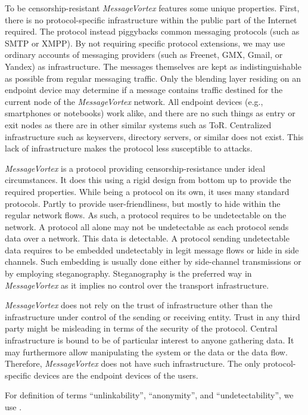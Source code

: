 \documentclass[acmsmall, screen, review]{acmart}
\begin{document}
To be censorship-resistant \emph{MessageVortex} features some unique properties. First, there is no protocol-specific infrastructure within the public part of the Internet required. The protocol instead piggybacks common messaging protocols (such as SMTP or XMPP). By not requiring specific protocol extensions, we may use ordinary accounts of messaging providers (such as Freenet, GMX, Gmail, or Yandex) as infrastructure. The messages themselves are kept as indistinguishable as possible from regular messaging traffic. Only the blending layer residing on an endpoint device may determine if a message contains traffic destined for the current node of the \emph{MessageVortex} network. All endpoint devices (e.g., smartphones or notebooks) work alike, and there are no such things as entry or exit nodes as there are in other similar systems such as ToR\cite{tor-spec}. Centralized infrastructure such as keyservers, directory servers, or similar does not exist. This lack of infrastructure makes the protocol less susceptible to attacks.

\emph{MessageVortex} is a protocol providing censorship-resistance under ideal circumstances. It does this using a rigid design from bottom up to provide the required properties. While being a protocol on its own, it uses many standard protocols. Partly to provide user-friendliness, but mostly to hide within the regular network flows. As such, a protocol requires to be undetectable on the network. A protocol all alone may not be undetectable as each protocol sends data over a network. This data is detectable. A protocol sending undetectable data requires to be embedded undetectably in legit message flows or hide in side channels. Such embedding is usually done either by side-channel transmissions or by employing steganography. Steganography is the preferred way in \emph{MessageVortex} as it implies no control over the transport infrastructure.

\emph{MessageVortex} does not rely on the trust of infrastructure other than the infrastructure under control of the sending or receiving entity. Trust in any third party might be misleading in terms of the security of the protocol. Central infrastructure is bound to be of particular interest to anyone gathering data. It may furthermore allow manipulating the system or the data or the data flow. Therefore, \emph{MessageVortex} does not have such infrastructure. The only protocol-specific devices are the endpoint devices of the users.

For definition of terms ``unlinkability'', ``anonymity'', and ``undetectability'', we use \cite{anonTerminology}.
\end{document}
